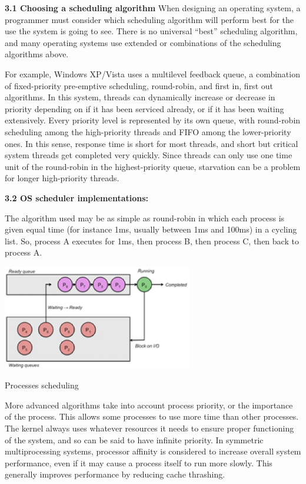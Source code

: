 \documentclass{article} %
\begin{document}
\noindent \textbf{3.1 Choosing a scheduling algorithm }When designing an operating system, a programmer must consider which scheduling algorithm will perform best for the use the system is going to see. There is no universal ``best'' scheduling algorithm, and many operating systems use extended or combinations of the scheduling algorithms above.

\noindent For example, Windows XP/Vista uses a multilevel feedback queue, a combination of fixed-priority pre-emptive scheduling, round-robin, and first in, first out algorithms. In this system, threads can dynamically increase or decrease in priority depending on if it has been serviced already, or if it has been waiting extensively. Every priority level is represented by its own queue, with round-robin scheduling among the high-priority threads and FIFO among the lower-priority ones. In this sense, response time is short for most threads, and short but critical system threads get completed very quickly. Since threads can only use one time unit of the round-robin in the highest-priority queue, starvation can be a problem for longer high-priority threads.

\noindent 

\noindent \textbf{3.2 OS scheduler implementations:}

\noindent The algorithm used may be as simple as round-robin in which each process is given equal time (for instance 1ms, usually between 1ms and 100ms) in a cycling list. So, process A executes for 1ms, then process B, then process C, then back to process A.

\noindent \includegraphics*[width=3.28in, height=1.80in, keepaspectratio=false]{image6}

\noindent Processes scheduling

\noindent More advanced algorithms take into account process priority, or the importance of the process. This allows some processes to use more time than other processes. The kernel always uses whatever resources it needs to ensure proper functioning of the system, and so can be said to have infinite priority. In symmetric multiprocessing systems, processor affinity is considered to increase overall system performance, even if it may cause a process itself to run more slowly. This generally improves performance by reducing cache thrashing. 
\end{document}

